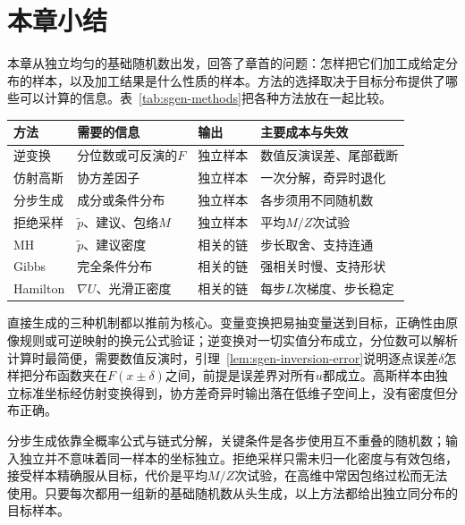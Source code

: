 \section{本章小结}
\label{sec:sgen-summary}

本章从独立均匀的基础随机数出发，回答了章首的问题：怎样把它们加工成给定分布的样本，以及加工结果是什么性质的样本。方法的选择取决于目标分布提供了哪些可以计算的信息。表~\ref{tab:sgen-methods}把各种方法放在一起比较。

\begin{BookInlineTable}
  \centering
  \small
  \begin{tabular}{@{}llll@{}}
    \toprule
    方法 & 需要的信息 & 输出 & 主要成本与失效 \\
    \midrule
    逆变换 & 分位数或可反演的$F$ & 独立样本 & 数值反演误差、尾部截断 \\
    仿射高斯 & 协方差因子 & 独立样本 & 一次分解，奇异时退化 \\
    分步生成 & 成分或条件分布 & 独立样本 & 各步须用不同随机数 \\
    拒绝采样 & $\widetilde{p}$、建议、包络$M$ & 独立样本 & 平均$M/Z$次试验 \\
    MH & $\widetilde{p}$、建议密度 & 相关的链 & 步长取舍、支持连通 \\
    Gibbs & 完全条件分布 & 相关的链 & 强相关时慢、支持形状 \\
    Hamilton & $\nabla U$、光滑正密度 & 相关的链 & 每步$L$次梯度、步长稳定 \\
    \bottomrule
  \end{tabular}
  \caption{采样生成方法的比较。前四种输出服从目标分布的独立样本；后三种输出以目标为不变分布的链，状态相关，能否走遍目标需另行论证。}
  \label{tab:sgen-methods}
\end{BookInlineTable}

直接生成的三种机制都以推前为核心。变量变换把易抽变量送到目标，正确性由原像规则或可逆映射的换元公式验证；逆变换对一切实值分布成立，分位数可以解析计算时最简便，需要数值反演时，引理~\ref{lem:sgen-inversion-error}说明逐点误差$\delta$怎样把分布函数夹在$F(x\pm\delta)$之间，前提是误差界对所有$u$都成立。高斯样本由独立标准坐标经仿射变换得到，协方差奇异时输出落在低维子空间上，没有密度但分布正确。

分步生成依靠全概率公式与链式分解，关键条件是各步使用互不重叠的随机数；输入独立并不意味着同一样本的坐标独立。拒绝采样只需未归一化密度与有效包络，接受样本精确服从目标，代价是平均$M/Z$次试验，在高维中常因包络过松而无法使用。只要每次都用一组新的基础随机数从头生成，以上方法都给出独立同分布的目标样本。

